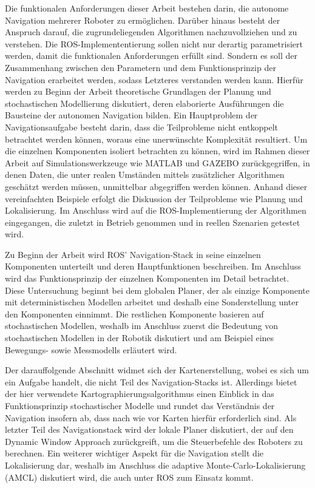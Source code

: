 Die funktionalen Anforderungen dieser Arbeit bestehen darin, die autonome Navigation mehrerer Roboter zu ermöglichen. Darüber hinaus besteht der Anspruch darauf, die zugrundeliegenden Algorithmen nachzuvollziehen und zu verstehen. Die ROS-Implemententierung sollen nicht nur derartig parametrisiert werden, damit die funktionalen Anforderungen erfüllt sind. Sondern es soll der Zusammenhang zwischen den Parametern und dem Funktionsprinzip der Navigation erarbeitet werden, sodass Letzteres verstanden werden kann. Hierfür werden zu Beginn der Arbeit theoretische Grundlagen der Planung und stochastischen Modellierung diskutiert, deren elaborierte Ausführungen die Bausteine der autonomen Navigation bilden.
Ein Hauptproblem der Navigationsaufgabe besteht darin, dass die Teilprobleme nicht entkoppelt betrachtet werden können, woraus eine unerwünschte Komplexität resultiert. Um die einzelnen Komponenten isoliert betrachten zu können, wird im Rahmen dieser Arbeit auf Simulationswerkzeuge wie MATLAB und GAZEBO zurückgegriffen, in denen Daten, die unter realen Umständen mittels zusätzlicher Algorithmen geschätzt werden müssen, unmittelbar abgegriffen werden können. Anhand dieser vereinfachten Beispiele erfolgt die Diskussion der Teilprobleme wie Planung und Lokalisierung. Im Anschluss wird auf die ROS-Implementierung der Algorithmen eingegangen, die zuletzt in Betrieb genommen und in reellen Szenarien getestet wird.

Zu Beginn der Arbeit wird ROS' Navigation-Stack in seine einzelnen Komponenten unterteilt und deren Hauptfunktionen beschreiben. Im Anschluss wird das Funktionsprinzip der einzelnen Komponenten im Detail betrachtet. Diese Untersuchung beginnt bei dem globalen Planer, der als einzige Komponente mit deterministischen Modellen arbeitet und deshalb eine Sonderstellung unter den Komponenten einnimmt. Die restlichen Komponente basieren auf stochastischen Modellen, weshalb im Anschluss zuerst die Bedeutung von stochastischen Modellen in der Robotik diskutiert und am Beispiel eines Bewegungs- sowie Messmodells erläutert wird.

Der darauffolgende Abschnitt widmet sich der Kartenerstellung, wobei es sich um ein Aufgabe handelt, die nicht Teil des Navigation-Stacks ist. Allerdings bietet der hier verwendete Kartographierungsalgorithmus einen Einblick in das Funktionsprinzip stochastischer Modelle und rundet das Verständnis der Navigation insofern ab, dass nach wie vor Karten hierfür erforderlich sind. Als letzter Teil des Navigationstack wird der lokale Planer diskutiert, der auf den Dynamic Window Approach zurückgreift, um die Steuerbefehle des Roboters zu berechnen.
Ein weiterer wichtiger Aspekt für die Navigation stellt die Lokalisierung dar, weshalb im Anschluss die adaptive Monte-Carlo-Lokalisierung (AMCL) diskutiert wird, die auch unter ROS zum Einsatz kommt. 

